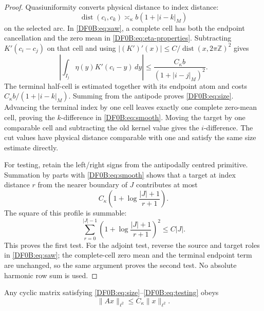 \begin{proof}
Quasiuniformity converts physical distance to index distance:
\[
 \operatorname {dist}(c_i,c_k)\asymp_\kappa
 b(1+|i-k|_M)
\]
on the selected arc.  In \eqref{DF0B:eq:saw}, a complete cell has both the
endpoint cancellation and the zero mean in
\eqref{DF0B:eq:eta-properties}.  Subtracting $K'(c_i-c_j)$ on that cell and
using $|(K')'(x)|\le C/\operatorname {dist}(x,2\pi\mathbb Z)^2$
gives
\[
 \left|\int_{I_j}\eta(y)K'(c_i-y)\,dy\right|
 \le \frac{C_\kappa b}{(1+|i-j|_M)^2}.
\]
The terminal half-cell is estimated together with its endpoint atom and
costs $C_\kappa b/(1+|i-k|_M)$.  Summing from the antipode proves
\eqref{DF0B:eq:size}.  Advancing the terminal index by one cell leaves exactly
one complete zero-mean cell, proving the $k$-difference in
\eqref{DF0B:eq:smooth}.  Moving the target by one comparable cell and
subtracting the old kernel value gives the $i$-difference.  The cut
values have physical distance comparable with one and satisfy the same
size estimate directly.

For testing, retain the left/right signs from the antipodally centred
primitive.  Summation by parts with \eqref{DF0B:eq:smooth} shows that a target
at index distance $r$ from the nearer boundary of $J$ contributes at
most
\[
 C_\kappa\left(1+\log\frac{|J|+1}{r+1}\right).
\]
The square of this profile is summable:
\[
 \sum_{r=0}^{|J|-1}
 \left(1+\log\frac{|J|+1}{r+1}\right)^2\le C|J|.
\]
This proves the first test.  For the adjoint test, reverse the source and
target roles in \eqref{DF0B:eq:saw}; the complete-cell zero mean and the
terminal endpoint term are unchanged, so the same argument proves the
second test.  No absolute harmonic row sum is used.
\end{proof}

\begin{lemma}
\label{DF0B:lem:T1}
Any cyclic matrix satisfying \eqref{DF0B:eq:size}--\eqref{DF0B:eq:testing} obeys
\begin{equation}\label{DF0B:eq:T1}
 \|Ax\|_{\ell^2}\le C_\kappa\|x\|_{\ell^2}.
\end{equation}
\end{lemma}

